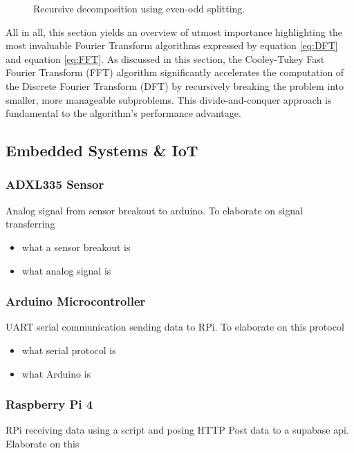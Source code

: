 {\begin{figure}[h]
    \caption{Recursive decomposition using even-odd splitting.}
    \label{fig:RecFFT}
\end{figure}

All in all, this section yields an overview of utmost importance highlighting the most invaluable Fourier Transform algorithms expressed by equation \eqref{eq:DFT} and equation \eqref{eq:FFT}.
As discussed in this section, the Cooley-Tukey Fast Fourier Transform (FFT) algorithm significantly accelerates the computation of the Discrete Fourier Transform (DFT) by recursively breaking the problem into smaller, more manageable subproblems. This divide-and-conquer approach is fundamental to the algorithm’s performance advantage.

}

\subsection{Embedded Systems \& IoT}
\subsubsection{ADXL335 Sensor}
Analog signal from sensor breakout to arduino. To elaborate on signal transferring
\begin{itemize}
\item what a sensor breakout is
\item what analog signal is
\end{itemize}


\subsubsection{Arduino Microcontroller}
UART serial communication sending data to RPi. To elaborate on this protocol
\begin{itemize}
\item what serial protocol is
\item what Arduino is
\end{itemize}

\subsubsection{Raspberry Pi 4}
RPi receiving data using a script and posing HTTP Post data to a supabase api. Elaborate on this


